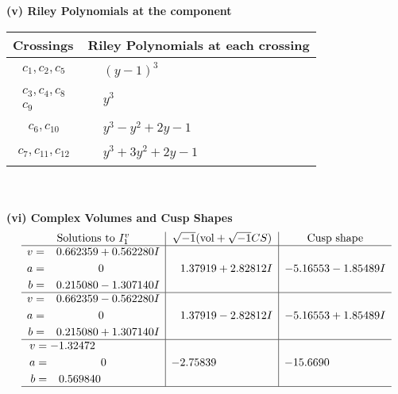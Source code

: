 \documentclass[1p]{elsarticle_modified}
\theoremstyle{definition}
\newcommand{\I}{\sqrt{-1}}
\begin{document}
\newpage\renewcommand{\arraystretch}{1}
\flushleft \textbf{(v) Riley Polynomials at the component}\newline \\
\begin{tabular}{m{50pt}|m{274pt}}
Crossings & \hspace{64pt}Riley Polynomials at each crossing \\
\hline $$\begin{aligned}c_{1},c_{2},c_{5}\end{aligned}$$&$\begin{aligned}
&(y-1)^3
\end{aligned}$\\
\hline $$\begin{aligned}c_{3},c_{4},c_{8}\\c_{9}\end{aligned}$$&$\begin{aligned}
&y^3
\end{aligned}$\\
\hline $$\begin{aligned}c_{6},c_{10}\end{aligned}$$&$\begin{aligned}
&y^3- y^2+2 y-1
\end{aligned}$\\
\hline $$\begin{aligned}c_{7},c_{11},c_{12}\end{aligned}$$&$\begin{aligned}
&y^3+3 y^2+2 y-1
\end{aligned}$\\
\hline
\end{tabular}\\~\\
\newpage\flushleft \textbf{(vi) Complex Volumes and Cusp Shapes}
$$\begin{array}{c|c|c}  
\text{Solutions to }I^v_{1}& \I (\text{vol} + \sqrt{-1}CS) & \text{Cusp shape}\\
 \hline 
\begin{aligned}
v &= \phantom{-}0.662359 + 0.562280 I \\
a &= \phantom{-0.000000 } 0 \\
b &= \phantom{-}0.215080 - 1.307140 I\end{aligned}
 & \phantom{-}1.37919 + 2.82812 I & -5.16553 - 1.85489 I \\ \hline\begin{aligned}
v &= \phantom{-}0.662359 - 0.562280 I \\
a &= \phantom{-0.000000 } 0 \\
b &= \phantom{-}0.215080 + 1.307140 I\end{aligned}
 & \phantom{-}1.37919 - 2.82812 I & -5.16553 + 1.85489 I \\ \hline\begin{aligned}
v &= -1.32472\phantom{ +0.000000I} \\
a &= \phantom{-0.000000 } 0 \\
b &= \phantom{-}0.569840\phantom{ +0.000000I}\end{aligned}
 & -2.75839\phantom{ +0.000000I} & -15.6690\phantom{ +0.000000I}\\
 \hline 
 \end{array}$$\newpage
\end{document}
